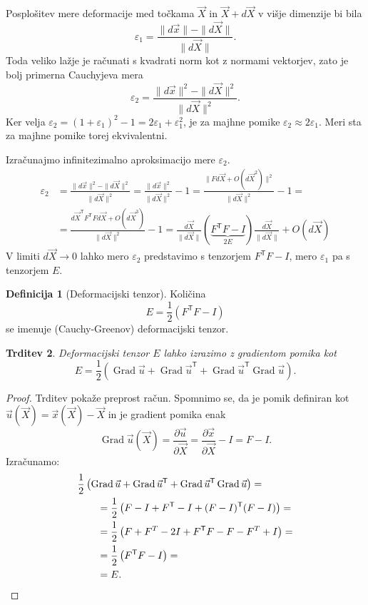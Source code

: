 \documentclass[12pt,a4paper,twoside]{article}
\theoremstyle{definition} %
\newtheorem{definicija}{Definicija}[section]
\theoremstyle{plain} %
\newtheorem{trditev}[definicija]{Trditev}
\numberwithin{equation}{section}
\newcommand{\T}{\mathsf{T}}
\newcommand{\Grad}{\operatorname{Grad}}
\newcommand{\eps}{\varepsilon}
\newcommand{\dpar}[2]{\ensuremath{\frac{\partial #1}{\partial #2}}}
\newcommand{\vu}{\vec{u}}
\newcommand{\vX}{\vec{X}}
\newcommand{\vx}{\vec{x}}
\begin{document}
Posplošitev mere deformacije med točkama $\vX$ in $\vX+d\vX$ v višje dimenzije bi bila
\begin{equation}
   \eps_1 = \frac{\|d\vx\| - \|d\vX\|}{\|d\vX\|}.
\end{equation}
Toda veliko lažje je računati s kvadrati norm kot z normami vektorjev, zato je
bolj primerna Cauchyjeva mera
\begin{equation}
  \eps_2 = \frac{\|d\vx\|^2 - \|d\vX\|^2}{\|d\vX\|^2}.
\end{equation}
Ker velja $\eps_2 = (1+\eps_1)^2 - 1 = 2\eps_1 + \eps_1^2$, je za majhne pomike
$\eps_2 \approx 2\eps_1$. Meri sta za majhne pomike torej ekvivalentni.

Izračunajmo infinitezimalno aproksimacijo mere $\eps_2$.
\begin{align}
  \eps_2 &=
  \frac{\|d\vx\|^2 - \|d\vX\|^2}{\|d\vX\|^2} =
  \frac{\|d\vx\|^2}{\|d\vX\|^2}  - 1=
  \frac{\|F d\vX + O(d\vX^2)\|^2}{\|d\vX\|^2} - 1 = \nonumber \\ &=
  \frac{d\vX^\T F^\T F d\vX + O(d\vX^3)}{\|d\vX\|^2} - 1 =
  \frac{d\vX}{\|d\vX\|}(\underbrace{F^\T F - I}_{2E})\frac{d\vX}{\|d\vX\|} + O(d\vX)
\end{align}
V limiti $d\vX \to 0$ lahko mero $\eps_2$ predstavimo s tenzorjem $F^\T F- I$,
mero $\eps_1$ pa s tenzorjem $E$.

\begin{definicija}[Deformacijski tenzor]
  Količina
  \begin{equation}
    E = \frac12 (F^\T F - I)
  \end{equation}
  se imenuje (Cauchy-Greenov) deformacijski tenzor.
\end{definicija}
\begin{trditev}
  Deformacijski tenzor $E$ lahko izrazimo z gradientom pomika kot
  \begin{equation}
    \label{eq:strain-tensor}
    E = \frac12\left( \Grad \vu + \Grad \vu^\T + \Grad \vu^\T \Grad \vu \right).
  \end{equation}
\end{trditev}
\begin{proof}
Trditev pokaže preprost račun. Spomnimo se, da je pomik definiran kot $\vu(\vX) =
\vx(\vX) - \vX$ in je gradient pomika enak
\[ \Grad \vu(\vX) = \dpar{\vu}{\vX} = \dpar{\vx}{\vX} - I = F - I. \]
Izračunamo:
\begin{align*}
  &\frac12\left( \Grad \vu + \Grad \vu^\T + \Grad \vu^\T \Grad \vu \right) = \\
  &\qquad=\frac12\left(F - I + F^\T - I  + (F-I)^\T(F-I)\right) = \\
  &\qquad=\frac12\left(F + F^T - 2I + F^\T F - F - F^T + I\right) = \\
  &\qquad=\frac12\left(F^\T F - I\right) = \\
  &\qquad=E.\qedhere
\end{align*}
\end{proof}
\end{document}
